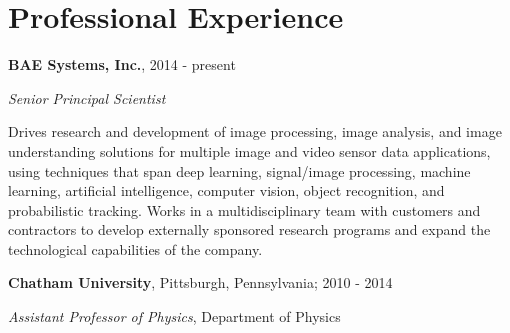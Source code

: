 \section{\sc Professional Experience} %


{\bf BAE Systems, Inc.}, 2014 - present
\begin{list1}
\item[] \textit{Senior Principal Scientist}
\item[] Drives research and development of image processing, image analysis, and image understanding solutions for multiple image and video sensor data applications, using techniques that span deep learning, signal/image processing, machine learning, artificial intelligence, computer vision, object recognition, and probabilistic tracking.  Works in a multidisciplinary team with customers and contractors to develop externally sponsored research programs and expand the technological capabilities of the company.
 
\end{list1}


{\bf Chatham University}, Pittsburgh, Pennsylvania; 2010 - 2014
\begin{list1}
\item[] {\em  Assistant Professor of Physics}, Department of Physics
\end{list1}


